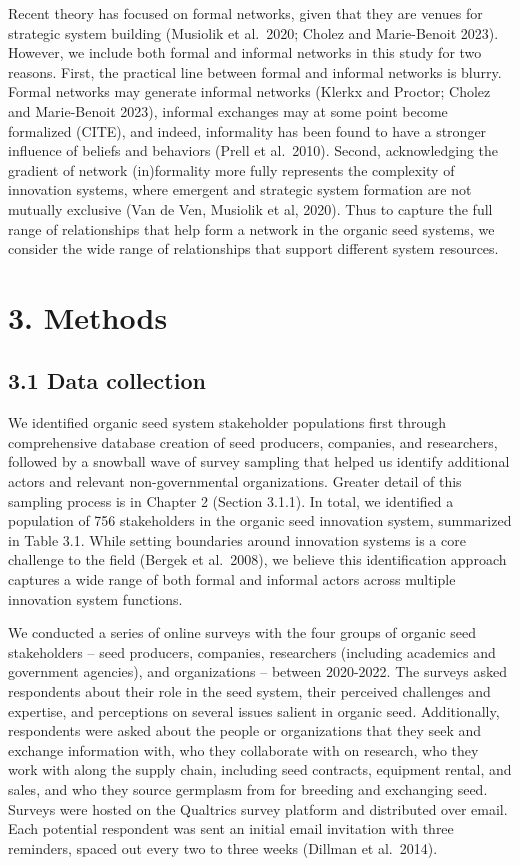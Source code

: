 \documentclass[twoside,12pt,final]{ucthesis-CA2012}
\begin{document}
\begin{ucmainmatter}
Recent theory has focused on formal networks, given that they are venues
for strategic system building (Musiolik et al.~2020; Cholez and
Marie-Benoit 2023). However, we include both formal and informal
networks in this study for two reasons. First, the practical line
between formal and informal networks is blurry. Formal networks may
generate informal networks (Klerkx and Proctor; Cholez and Marie-Benoit
2023), informal exchanges may at some point become formalized (CITE),
and indeed, informality has been found to have a stronger influence of
beliefs and behaviors (Prell et al.~2010). Second, acknowledging the
gradient of network (in)formality more fully represents the complexity
of innovation systems, where emergent and strategic system formation are
not mutually exclusive (Van de Ven, Musiolik et al, 2020). Thus to
capture the full range of relationships that help form a network in the
organic seed systems, we consider the wide range of relationships that
support different system resources.

\hypertarget{methods-2}{%
\section{3. Methods}\label{methods-2}}

\hypertarget{data-collection}{%
\subsection{3.1 Data collection}\label{data-collection}}

We identified organic seed system stakeholder populations first through
comprehensive database creation of seed producers, companies, and
researchers, followed by a snowball wave of survey sampling that helped
us identify additional actors and relevant non-governmental
organizations. Greater detail of this sampling process is in Chapter 2
(Section 3.1.1). In total, we identified a population of 756
stakeholders in the organic seed innovation system, summarized in Table
3.1. While setting boundaries around innovation systems is a core
challenge to the field (Bergek et al.~2008), we believe this
identification approach captures a wide range of both formal and
informal actors across multiple innovation system functions.

We conducted a series of online surveys with the four groups of organic
seed stakeholders -- seed producers, companies, researchers (including
academics and government agencies), and organizations -- between
2020-2022. The surveys asked respondents about their role in the seed
system, their perceived challenges and expertise, and perceptions on
several issues salient in organic seed. Additionally, respondents were
asked about the people or organizations that they seek and exchange
information with, who they collaborate with on research, who they work
with along the supply chain, including seed contracts, equipment rental,
and sales, and who they source germplasm from for breeding and
exchanging seed. Surveys were hosted on the Qualtrics survey platform
and distributed over email. Each potential respondent was sent an
initial email invitation with three reminders, spaced out every two to
three weeks (Dillman et al.~2014).


\end{ucmainmatter}
\end{document}
